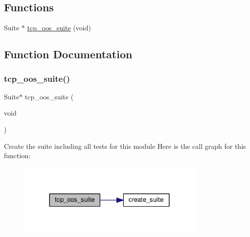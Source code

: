 \subsection*{Functions}
\begin{DoxyCompactItemize}
\item 
Suite $\ast$ \hyperlink{openmote-cc2538_2lwip_2test_2unit_2tcp_2test__tcp__oos_8h_a6c32e1a11e954785c70eff2c1f6a77b4}{tcp\+\_\+oos\+\_\+suite} (void)
\end{DoxyCompactItemize}


\subsection{Function Documentation}
\mbox{\label{openmote-cc2538_2lwip_2test_2unit_2tcp_2test__tcp__oos_8h_a6c32e1a11e954785c70eff2c1f6a77b4}} 
\subsubsection{\texorpdfstring{tcp\+\_\+oos\+\_\+suite()}{tcp\_oos\_suite()}}
{\footnotesize\ttfamily Suite$\ast$ tcp\+\_\+oos\+\_\+suite (\begin{DoxyParamCaption}\item[{void}]{ }\end{DoxyParamCaption})}

Create the suite including all tests for this module Here is the call graph for this function\+:
\nopagebreak
\begin{figure}[H]
\begin{center}
\leavevmode
\includegraphics[width=263pt]{openmote-cc2538_2lwip_2test_2unit_2tcp_2test__tcp__oos_8h_a6c32e1a11e954785c70eff2c1f6a77b4_cgraph}
\end{center}
\end{figure}
